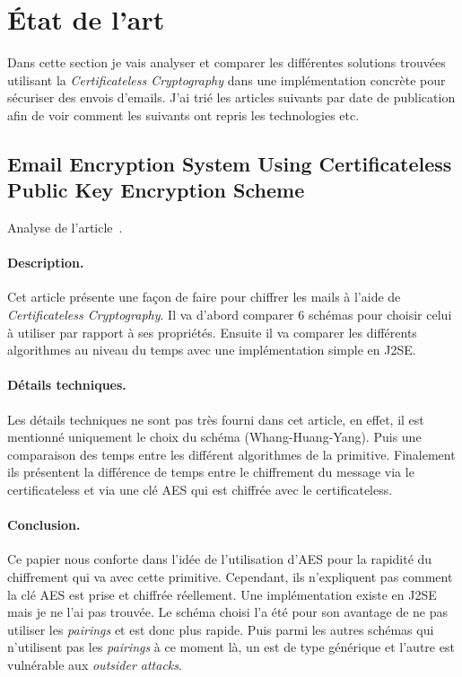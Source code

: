 \section{État de l'art}
Dans cette section je vais analyser et comparer les différentes solutions trouvées utilisant la \textit{Certificateless Cryptography} dans une implémentation concrète pour sécuriser des envois d'emails. J'ai trié les articles suivants par date de publication afin de voir comment les suivants ont repris les technologies etc.
\subsection{Email Encryption System Using Certificateless Public Key Encryption Scheme}
Analyse de l'article~\cite{DBLP:conf/itcs2/ErYTG12}.
\paragraph*{Description.} Cet article présente une façon de faire pour chiffrer les mails à l'aide de \textit{Certificateless Cryptography}. Il va d'abord comparer 6 schémas pour choisir celui à utiliser par rapport à ses propriétés. Ensuite il va comparer les différents algorithmes au niveau du temps avec une implémentation simple en J2SE. 
\paragraph*{Détails techniques.} Les détails techniques ne sont pas très fourni dans cet article, en effet, il est mentionné uniquement le choix du schéma (Whang-Huang-Yang). Puis une comparaison des temps entre les différent algorithmes de la primitive. Finalement ils présentent la différence de temps entre le chiffrement du message via le certificateless et via une clé AES qui est chiffrée avec le certificateless.
\paragraph*{Conclusion.} Ce papier nous conforte dans l'idée de l'utilisation d'AES pour la rapidité du chiffrement qui va avec cette primitive. Cependant, ils n'expliquent pas comment la clé AES est prise et chiffrée réellement. Une implémentation existe en J2SE mais je ne l'ai pas trouvée. Le schéma choisi l'a été pour son avantage de ne pas utiliser les \textit{pairings} et est donc plus rapide. Puis parmi les autres schémas qui n'utilisent pas les \textit{pairings} à ce moment là, un est de type générique et l'autre est vulnérable aux \textit{outsider attacks}.
